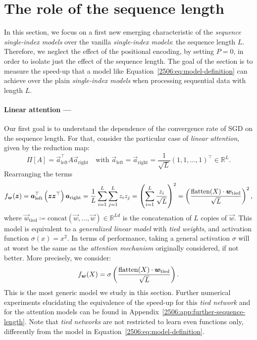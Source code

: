 \section{The role of the sequence length}
In this section, we focus on a first new emerging characteristic of the \emph{sequence single-index models} over the vanilla \emph{single-index models}: the sequence length \(L\). Therefore, we neglect the effect of the positional encoding, by setting \(P=0\), in order to isolate just the effect of the sequence length. The goal of the section is to measure the speed-up that a model like Equation~\eqref{2506:eq:model-definition} can achieve over the plain \emph{single-index models} when processing sequential data with length \(L\).

\paragraph{Linear attention ---} 
Our first goal is to understand the dependence of the convergence rate of SGD on the sequence length. For that, consider the particular case of \emph{linear attention}, given by the reduction map:
\begin{equation}
    \Pi[A] = \vec{a}_\mathrm{left}^\top A \vec{a}_\mathrm{right} \quad \text{with } \vec{a}_\mathrm{left} = \vec{a}_\mathrm{right} = \frac{1}{\sqrt{L}} \left(1, 1, \ldots, 1\right)^\top \in \mathbb{R}^L.
\end{equation}
Rearranging the terms
\begin{equation}
    f_{{\boldsymbol{w}}}({\boldsymbol{z}}) = {\boldsymbol{a}}_\mathrm{left}^\top \left({\boldsymbol{z}}{\boldsymbol{z}}^\top\right) {\boldsymbol{a}}_\mathrm{right} = \frac{1}{L} \sum_{i=1}^L \sum_{j=1}^L z_i z_j = \left(\sum_{i=1}^L \frac{z_i}{\sqrt{L}}\right)^2 = \left(\frac{\operatorname{flatten}(X)\cdot {\boldsymbol{w}}_\mathrm{tied}}{\sqrt{L}}\right)^2,
\end{equation}
where \(\vec{w}_\mathrm{tied} \coloneqq \mathrm{concat}(\vec{w}, \dots, \vec{w}) \in \mathbb{R}^{Ld}\) is the concatenation of \(L\) copies of \(\vec{w}\). This model is equivalent to a \emph{generalized linear model} with \emph{tied weights}, and activation function \(\sigma(x) = x^2\). In terms of performance, taking a general activation \(\sigma\) will at worst be the same as the \emph{attention mechanism} originally considered, if not better. More precisely, we consider:
\begin{equation} \label{2506:eq:tied-network-definition}
    f_{{\boldsymbol{w}}}(X) = \sigma\left(\frac{\operatorname{flatten}(X)\cdot {\boldsymbol{w}}_\mathrm{tied}}{\sqrt{L}}\right).
\end{equation}
This is the most generic model we study in this section. Further numerical experiments elucidating the equivalence of the speed-up for this \emph{tied network} and for the attention models can be found in Appendix~\ref{2506:app:further-sequence-length}. Note that \emph{tied networks} are not restricted to learn even functions only, differently from the model in Equation~\eqref{2506:eq:model-definition}.


